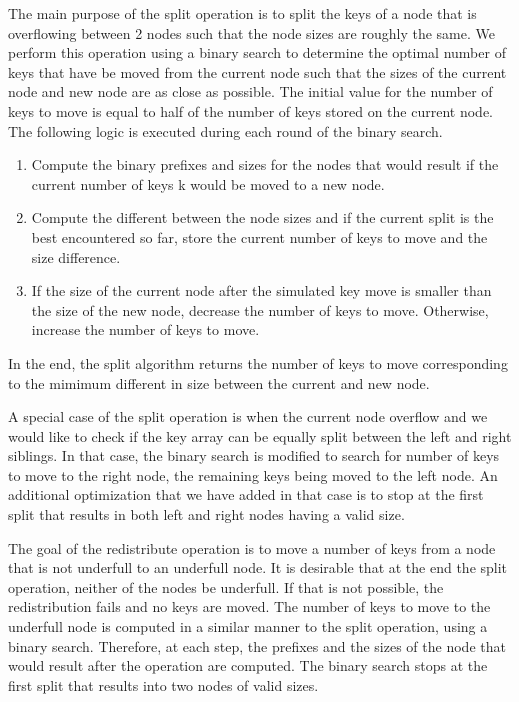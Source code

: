 \documentclass[11pt,a4paper,oneside]{article}
\begin{document}
The main purpose of the split operation is to split the keys of a node that is overflowing between 2 nodes such that the node sizes are roughly the same. We perform this operation using a binary search to determine the optimal number of keys that have be moved from the current node such that the sizes of the current node and new node are as close as possible. The initial value for the number of keys to move is equal to half of the number of keys stored on the current node. The following logic is executed during each round of the binary search. 
\begin{enumerate}
	\item Compute the binary prefixes and sizes for the nodes that would result if the current number of keys k would be moved to a 
	new node. 
	\item Compute the different between the node sizes and if the current split is the best encountered so far, store the current number of keys to move and the size difference.
	\item If the size of the current node after the simulated key move is smaller than the size of the new node, decrease the number of keys to move. Otherwise, increase the number of keys to move.
\end{enumerate}
In the end, the split algorithm returns the number of keys to move corresponding to the mimimum different in size between the current and new node.

A special case of the split operation is when the current node overflow and we would like to check if the key array can be equally split between the left and right siblings. In that case, the binary search is modified to search for number of keys to move to the right node, the remaining keys being moved to the left node. An additional optimization that we have added in that case is to stop at the first split that results in both left and right nodes having a valid size.

The goal of the redistribute operation is to move a number of keys from a node that is not underfull to an underfull node. It is desirable that at the end the split operation, neither of the nodes be underfull. If that is not possible, the redistribution fails and no keys are moved. The number of keys to move to the underfull node is computed in a similar manner to the split operation, using a binary search. Therefore, at each step, the prefixes and the sizes of the node that would result after the operation are computed. The binary search stops at the first split that results into two nodes of valid sizes.
\end{document}
